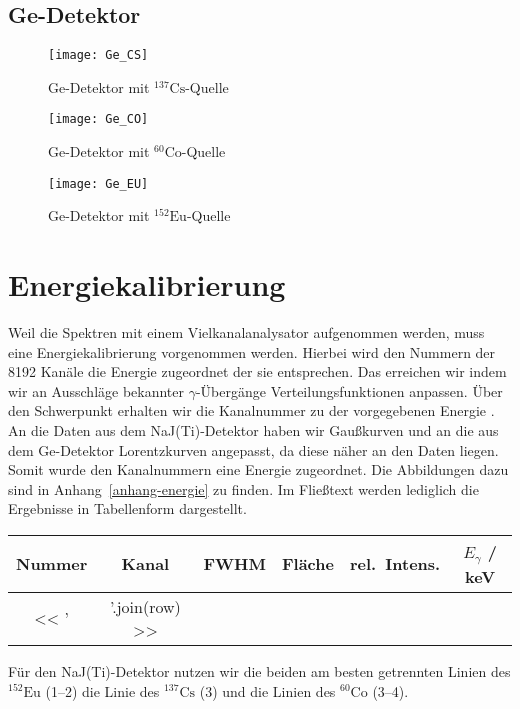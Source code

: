 \documentclass[11pt, ngerman, fleqn, DIV=15, headinclude, BCOR=2cm]{scrreprt}
\newcommand{\plotwidth}{0.8\linewidth}
\begin{document}
\clearpage
\subsection{Ge-Detektor}

\begin{figure}[htbp]
	\centering
	\texttt{[image: Ge\_CS]}
	\caption{%
            Ge-Detektor mit $^{137}\text{Cs}$-Quelle
	}
	\label{fig:Ge_CS}
\end{figure}
\begin{figure}[htbp]
	\centering
	\texttt{[image: Ge\_CO]}
	\caption{%
            Ge-Detektor mit $^{60}\text{Co}$-Quelle
	}
	\label{fig:Ge_CO}
\end{figure}
\begin{figure}[htbp]
	\centering
	\texttt{[image: Ge\_EU]}
	\caption{%
            Ge-Detektor mit $^{152}\text{Eu}$-Quelle
	}
	\label{fig:Ge_EU}
\end{figure}



\section{Energiekalibrierung}

Weil die Spektren mit einem Vielkanalanalysator aufgenommen werden, muss eine
Energiekalibrierung vorgenommen werden. Hierbei wird den Nummern der 8192
Kanäle die Energie zugeordnet der sie entsprechen.
Das erreichen wir indem wir an Ausschläge bekannter $\gamma$-Übergänge
Verteilungsfunktionen anpassen. Über den Schwerpunkt erhalten wir die Kanalnummer zu 
der vorgegebenen Energie . 
An die Daten aus dem NaJ(Ti)-Detektor haben wir Gaußkurven und an die
aus dem Ge-Detektor Lorentzkurven angepasst, da diese näher an den Daten liegen.
Somit wurde den Kanalnummern eine Energie zugeordnet.
Die Abbildungen dazu sind in Anhang~\ref{anhang-energie} zu finden. Im
Fließtext werden lediglich die Ergebnisse in Tabellenform dargestellt.


\begin{tabular}{SSSSSS}
    {Nummer} & {Kanal} & {FWHM} & {Fläche} & {rel.\ Intens.} &
    {$E_\gamma$ / \si{\kilo\electronvolt}} \\
    \midrule
    << ' & '.join(row) >> \\
\end{tabular}

Für den NaJ(Ti)-Detektor nutzen wir die beiden am besten getrennten Linien des
$^{152}\text{Eu}$ (\numrange{1}{2}) die Linie des $^{137}\text{Cs}$ (\num{3}) und die Linien des
$^{60}\text{Co}$ (\numrange{3}{4}).
\end{document}

